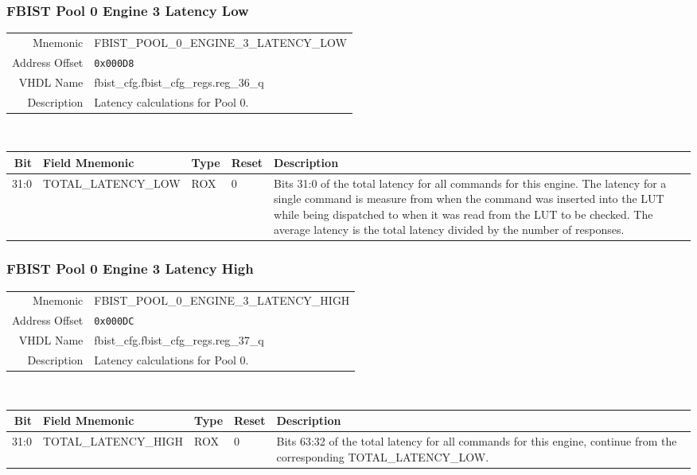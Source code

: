\subsubsection{FBIST Pool 0 Engine 3 Latency Low}
\begin{tabular}{ r | p{350px} }
  Mnemonic       & FBIST\_POOL\_0\_ENGINE\_3\_LATENCY\_LOW \\
  Address Offset & \texttt{0x000D8}                        \\
  VHDL Name      &  fbist\_cfg.fbist\_cfg\_regs.reg\_36\_q \\ \hline

  Description &
  Latency calculations for Pool 0. \\
\end{tabular}
\\
\begin{tabularx}{\textwidth}{r|l|l|l|X}
  \hline
  Bit   & Field Mnemonic      & Type & Reset & Description \\ \hline

  31:0  & TOTAL\_LATENCY\_LOW & ROX  & 0     &

  Bits 31:0 of the total latency for all commands for this engine. The
  latency for a single command is measure from when the command was
  inserted into the LUT while being dispatched to when it was read
  from the LUT to be checked. The average latency is the total latency
  divided by the number of responses. \\
\end{tabularx}

\subsubsection{FBIST Pool 0 Engine 3 Latency High}
\begin{tabular}{ r | p{350px} }
  Mnemonic       & FBIST\_POOL\_0\_ENGINE\_3\_LATENCY\_HIGH \\
  Address Offset & \texttt{0x000DC}                         \\
  VHDL Name      &  fbist\_cfg.fbist\_cfg\_regs.reg\_37\_q  \\ \hline

  Description &
  Latency calculations for Pool 0. \\
\end{tabular}
\\
\begin{tabularx}{\textwidth}{r|l|l|l|X}
  \hline
  Bit   & Field Mnemonic       & Type & Reset & Description \\ \hline

  31:0  & TOTAL\_LATENCY\_HIGH & ROX  & 0     &

  Bits 63:32 of the total latency for all commands for this engine,
  continue from the corresponding TOTAL\_LATENCY\_LOW. \\
\end{tabularx}

